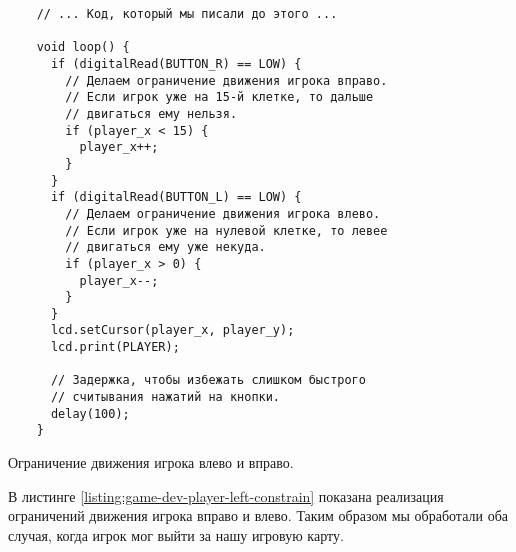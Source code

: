 \documentclass[../sparc.tex]{subfiles}
\begin{document}
\begin{listing}[ht]
  \begin{verbatim}
    // ... Код, который мы писали до этого ...

    void loop() {
      if (digitalRead(BUTTON_R) == LOW) {
        // Делаем ограничение движения игрока вправо.
        // Если игрок уже на 15-й клетке, то дальше
        // двигаться ему нельзя.
        if (player_x < 15) {
          player_x++;
        }
      }
      if (digitalRead(BUTTON_L) == LOW) {
        // Делаем ограничение движения игрока влево.
        // Если игрок уже на нулевой клетке, то левее
        // двигаться ему уже некуда.
        if (player_x > 0) {
          player_x--;
        }
      }
      lcd.setCursor(player_x, player_y);
      lcd.print(PLAYER);

      // Задержка, чтобы избежать слишком быстрого
      // считывания нажатий на кнопки.
      delay(100);
    }
  \end{verbatim}
  \caption{Ограничение движения игрока влево и вправо.}
  \label{listing:game-dev-player-left-constrain}
\end{listing}

В листинге \ref{listing:game-dev-player-left-constrain} показана реализация
ограничений движения игрока вправо и влево.  Таким образом мы обработали оба
случая, когда игрок мог выйти за нашу игровую карту.
\end{document}
